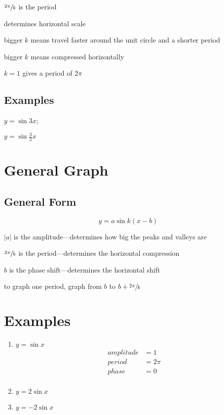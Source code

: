 \documentclass{exam}
\begin{document}
  \begin{itemize*}
    \item $\sfrac{2 \pi}{k}$ is the period
    \item determines horizontal scale
    \item bigger $k$ means travel faster around the unit circle and a shorter period
    \item bigger $k$ means compressed horizontally
    \item $k = 1$ gives a period of $2 \pi$
  \end{itemize*}

  \subsection{Examples}
  \begin{enumerate*}
    \item $y = \sin 3x$; 
    \item $y = \sin \frac{3}{2} x$
  \end{enumerate*}

  \section{General Graph}
  \subsection{General Form}
  \[
    y = a \sin k(x - b)
  \]

  \begin{itemize*}
    \item $|a|$ is the amplitude---determines how big the peaks and valleys are
    \item $\sfrac{2 \pi}{k}$ is the period---determines the horizontal compression
    \item $b$ is the phase shift---determines the horizontal shift
    \item to graph one period, graph from $b$ to $b + \sfrac{2 \pi}{k}$
  \end{itemize*}

  \section{Examples}

  \begin{enumerate}
    \item $y = \sin x$
      \begin{align*}
        amplitude & = 1 \\
        period    & = 2 \pi \\
        phase     & = 0 \\
      \end{align*}

    \item $y = 2 \sin x$
    \item $y = - 2 \sin x$
  \end{enumerate}
\end{document}
